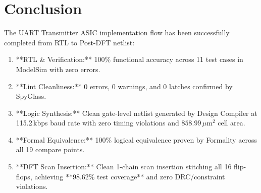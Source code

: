 \documentclass[12pt,a4paper]{article}
\begin{document}
\section{Conclusion}

The UART Transmitter ASIC implementation flow has been successfully completed from RTL to Post-DFT netlist:
\begin{enumerate}
  \item **RTL \& Verification:** 100\% functional accuracy across 11 test cases in ModelSim with zero errors.
  \item **Lint Cleanliness:** 0 errors, 0 warnings, and 0 latches confirmed by SpyGlass.
  \item **Logic Synthesis:** Clean gate-level netlist generated by Design Compiler at 115.2\,kbps baud rate with zero timing violations and $858.99\,\mu$m$^2$ cell area.
  \item **Formal Equivalence:** 100\% logical equivalence proven by Formality across all 19 compare points.
  \item **DFT Scan Insertion:** Clean 1-chain scan insertion stitching all 16 flip-flops, achieving **98.62\% test coverage** and zero DRC/constraint violations.
\end{enumerate}
\end{document}
